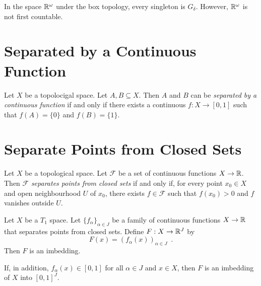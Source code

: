 \begin{example}
    In the space $\mathbb{R}^\omega$ under the box topology, every singleton is $G_\delta$.
    However, $\mathbb{R}^\omega$ is not first countable.
\end{example}

\section{Separated by a Continuous Function}

\begin{definition}
    Let $X$ be a topolocigal space. Let $A, B \subseteq X$. Then $A$ and $B$
    can be \emph{separated by a continuous function} if and only if there exists
    a continuous $f : X \rightarrow [0,1]$ such that $f(A) = \{0\}$ and
    $f(B) = \{1\}$.
\end{definition}

\section{Separate Points from Closed Sets}

\begin{definition}
    Let $X$ be a topological space. Let $\mathcal{F}$ be a set of continuous
    functions $X \rightarrow \mathbb{R}$. Then $\mathcal{F}$ \emph{separates points
    from closed sets} if and only if, for every point $x_0 \in X$
    and open neighbourhood $U$ of $x_0$, there exists $f \in \mathcal{F}$
    such that $f(x_0) > 0$ and $f$ vanishes outside $U$.
\end{definition}

\begin{theorem}
    Let $X$ be a $T_1$ space. Let $\{ f_\alpha \}_{\alpha \in J}$ be a family of
    continuous functions $X \rightarrow \mathbb{R}$ that separates points from
    closed sets. Define $F : X
    \rightarrow \mathbb{R}^J$ by
    \[ F(x) = (f_\alpha(x))_{\alpha \in J} \enspace . \]
    Then $F$ is an imbedding.

    If, in addition, $f_\alpha(x) \in [0,1]$ for all $\alpha \in J$ and $x \in X$,
    then $F$ is an imbedding of $X$ into $[0,1]^J$.
\end{theorem}

